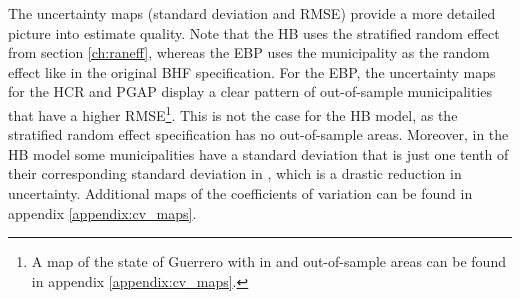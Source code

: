 The uncertainty maps (standard deviation and RMSE) provide a more detailed picture into estimate quality.
Note that the HB uses the stratified random effect from section \ref{ch:raneff}, whereas the EBP uses the municipality as the random effect like in the original BHF specification.
For the EBP, the uncertainty maps for the HCR and PGAP display a clear pattern of out-of-sample municipalities that have a higher RMSE\footnote{A map of the state of Guerrero with in and out-of-sample areas can be found in appendix \ref{appendix:cv_maps}.}.
This is not the case for the HB model, as the stratified random effect specification has no out-of-sample areas.
Moreover, in the HB model some municipalities have a standard deviation that is just one tenth of their corresponding standard deviation in \cite{morelli_hierarchical_2021}, which is a drastic reduction in uncertainty.
Additional maps of the coefficients of variation can be found in appendix \ref{appendix:cv_maps}.

